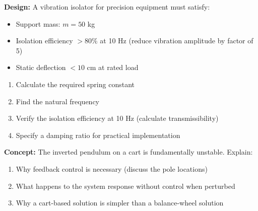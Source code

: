 \begin{exercise}
\textbf{Design:} A vibration isolator for precision equipment must satisfy:
\begin{itemize}
    \item Support mass: $m = 50$ kg
    \item Isolation efficiency $> 80\%$ at 10 Hz (reduce vibration amplitude by factor of 5)
    \item Static deflection $< 10$ cm at rated load
\end{itemize}

\begin{enumerate}[label=(\alph*)]
    \item Calculate the required spring constant
    \item Find the natural frequency
    \item Verify the isolation efficiency at 10 Hz (calculate transmissibility)
    \item Specify a damping ratio for practical implementation
\end{enumerate}
\end{exercise}

\begin{exercise}
\textbf{Concept:} The inverted pendulum on a cart is fundamentally unstable. Explain:

\begin{enumerate}[label=(\alph*)]
    \item Why feedback control is necessary (discuss the pole locations)
    \item What happens to the system response without control when perturbed
    \item Why a cart-based solution is simpler than a balance-wheel solution
\end{enumerate}
\end{exercise}

